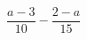 \begin{ex}[type=expression]
	\begin{condition}
		\( \dfrac{a-3}{10}-\dfrac{2-a}{15} \)
	\end{condition}
\end{ex}